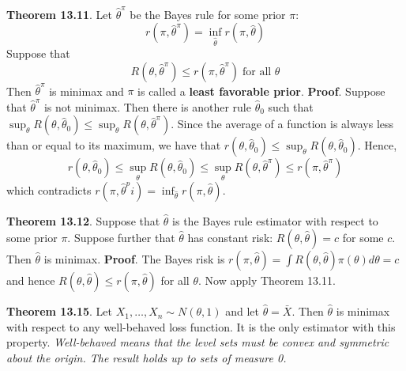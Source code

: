 \textbf{Theorem 13.11}. Let \(\hat{\theta}^\pi\) be the Bayes rule for
some prior \(\pi\):
\[
r(\pi, \hat{\theta}^\pi) = \inf_{\hat{\theta}} r(\pi, \hat{\theta})
\]
Suppose that
\[
R(\theta, \hat{\theta}^\pi) \leq r(\pi, \hat{\theta}^\pi) \;\text{for all } \theta
\]
Then \(\hat{\theta}^\pi\) is minimax and \(\pi\) is called a
\textbf{least favorable prior}.
\textbf{Proof}. Suppose that \(\hat{\theta}^\pi\) is not minimax. Then
there is another rule \(\hat{\theta}_{0}\) such that
\(\sup_\theta R(\theta, \hat{\theta}_{0}) \leq \sup_\theta R(\theta, \hat{\theta}^\pi)\).
Since the average of a function is always less than or equal to its
maximum, we have that
\(r(\theta, \hat{\theta}_{0}) \leq \sup_\theta R(\theta, \hat{\theta}_{0})\).
Hence,
\[
r(\theta, \hat{\theta}_{0}) \leq \sup_\theta R(\theta, \hat{\theta}_{0}) \leq \sup_\theta R(\theta, \hat{\theta}^\pi) \leq r(\pi, \hat{\theta}^\pi)
\]
which contradicts
\(r(\pi, \hat{\theta}^pi) = \inf_{\hat{\theta}} r(\pi, \hat{\theta})\).

\textbf{Theorem 13.12}. Suppose that \(\hat{\theta}\) is the Bayes rule
estimator with respect to some prior \(\pi\). Suppose further that
\(\hat{\theta}\) has constant risk: \(R(\theta, \hat{\theta}) = c\) for
some \(c\). Then \(\hat{\theta}\) is minimax.
\textbf{Proof}. The Bayes risk is
\(r(\pi, \hat{\theta}) = \int R(\theta, \hat{\theta}) \pi(\theta) d\theta = c\)
and hence \(R(\theta, \hat{\theta}) \leq r(\pi, \hat{\theta})\) for all
\(\theta\). Now apply Theorem 13.11.

\textbf{Theorem 13.15}. Let \(X_{1}, \dots, X_{n} \sim N(\theta, 1)\) and
let \(\hat{\theta} = \bar{X}\). Then \(\hat{\theta}\) is minimax
with respect to any well-behaved loss function. It is the only estimator
with this property.
\emph{Well-behaved means that the level sets must be convex and
symmetric about the origin. The result holds up to sets of measure 0.}

